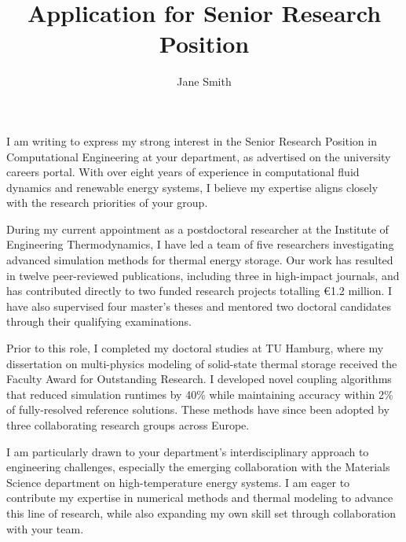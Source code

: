 \documentclass[
    language=english,
    doctype=letter,
    institution=none,
]{../../omnilatex}
\title{Application for Senior Research Position}
\author{Jane Smith}
\date{}
\begin{document}
\maketitle

I am writing to express my strong interest in the Senior Research Position
in Computational Engineering at your department, as advertised on the
university careers portal. With over eight years of experience in
computational fluid dynamics and renewable energy systems, I believe my
expertise aligns closely with the research priorities of your group.

During my current appointment as a postdoctoral researcher at the Institute
of Engineering Thermodynamics, I have led a team of five researchers
investigating advanced simulation methods for thermal energy storage. Our
work has resulted in twelve peer-reviewed publications, including three in
high-impact journals, and has contributed directly to two funded research
projects totalling \euro{}1.2 million. I have also supervised four master's
theses and mentored two doctoral candidates through their qualifying
examinations.

Prior to this role, I completed my doctoral studies at TU Hamburg, where
my dissertation on multi-physics modeling of solid-state thermal storage
received the Faculty Award for Outstanding Research. I developed novel
coupling algorithms that reduced simulation runtimes by 40\% while
maintaining accuracy within 2\% of fully-resolved reference solutions.
These methods have since been adopted by three collaborating research groups
across Europe.

I am particularly drawn to your department's interdisciplinary approach
to engineering challenges, especially the emerging collaboration with the
Materials Science department on high-temperature energy systems. I am eager
to contribute my expertise in numerical methods and thermal modeling to
advance this line of research, while also expanding my own skill set through
collaboration with your team.

\end{document}
